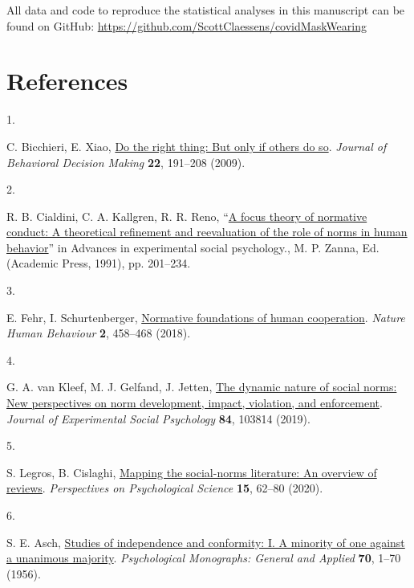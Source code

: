 \documentclass[
  man, donotrepeattitle,floatsintext]{apa6}
\newlength{\cslhangindent}
\newlength{\csllabelwidth}
\newlength{\cslentryspacingunit} %
\newenvironment{CSLReferences}[2] %
 {%
  \setlength{\parindent}{0pt}
  \ifodd #1
  \let\oldpar\par
  \def\par{\hangindent=\cslhangindent\oldpar}
  \fi
  \setlength{\parskip}{#2\cslentryspacingunit}
 }%
 {}
\newcommand{\CSLLeftMargin}[1]{\parbox[t]{\csllabelwidth}{#1}}
\newcommand{\CSLRightInline}[1]{\parbox[t]{\linewidth - \csllabelwidth}{#1}\break}
\begin{document}
All data and code to reproduce the statistical analyses in this manuscript can be found on GitHub: \url{https://github.com/ScottClaessens/covidMaskWearing}

\newpage

\hypertarget{references}{%
\section{References}\label{references}}

\begingroup

\hypertarget{refs}{}
\begin{CSLReferences}{0}{0}
\leavevmode{}%
\CSLLeftMargin{1. }%
\CSLRightInline{C. Bicchieri, E. Xiao, \href{https://doi.org/10.1002/bdm.621}{Do the right thing: But only if others do so}. \emph{Journal of Behavioral Decision Making} \textbf{22}, 191--208 (2009).}

\leavevmode{}%
\CSLLeftMargin{2. }%
\CSLRightInline{R. B. Cialdini, C. A. Kallgren, R. R. Reno, {``\href{https://doi.org/10.1016/S0065-2601(08)60330-5}{A focus theory of normative conduct: A theoretical refinement and reevaluation of the role of norms in human behavior}''} in Advances in experimental social psychology., M. P. Zanna, Ed. (Academic Press, 1991), pp. 201--234.}

\leavevmode{}%
\CSLLeftMargin{3. }%
\CSLRightInline{E. Fehr, I. Schurtenberger, \href{https://doi.org/10.1038/s41562-018-0385-5}{Normative foundations of human cooperation}. \emph{Nature Human Behaviour} \textbf{2}, 458--468 (2018).}

\leavevmode{}%
\CSLLeftMargin{4. }%
\CSLRightInline{G. A. van Kleef, M. J. Gelfand, J. Jetten, \href{https://doi.org/10.1016/j.jesp.2019.05.002}{The dynamic nature of social norms: New perspectives on norm development, impact, violation, and enforcement}. \emph{Journal of Experimental Social Psychology} \textbf{84}, 103814 (2019).}

\leavevmode{}%
\CSLLeftMargin{5. }%
\CSLRightInline{S. Legros, B. Cislaghi, \href{https://doi.org/10.1177/1745691619866455}{Mapping the social-norms literature: An overview of reviews}. \emph{Perspectives on Psychological Science} \textbf{15}, 62--80 (2020).}

\leavevmode{}%
\CSLLeftMargin{6. }%
\CSLRightInline{S. E. Asch, \href{https://doi.org/10.1037/h0093718}{Studies of independence and conformity: I. A minority of one against a unanimous majority}. \emph{Psychological Monographs: General and Applied} \textbf{70}, 1--70 (1956).}


\end{CSLReferences}
\end{document}
